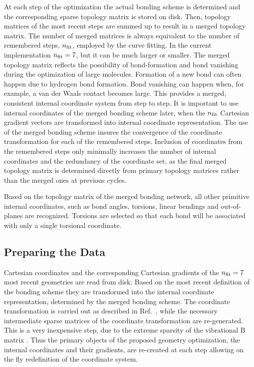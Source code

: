 \documentclass[prl,twocolumn,showpacs,twocolumngrid,superbib]{revtex4}
\begin{document}
At each step of the optimization the actual bonding scheme is determined and the corresponding 
sparse topology matrix is stored on disk.  Then, topology matrices of the most recent steps are 
summed up to result in a merged topology matrix.  The number of merged matrices is always equivalent 
to the number of remembered steps, $n_{\rm fit}$, employed by the curve fitting. In the current implementation 
$n_{\rm fit}=7$, but it can be much larger or smaller.  The merged topology matrix reflects the possibility of 
bond-formation and bond vanishing during the optimization of large molecules.  Formation of a new 
bond can often happen due to hydrogen bond formation. Bond vanishing can happen when, for example,
a van der Waals contact becomes large.  This provides a merged, consistent internal coordinate 
system from step to step.  It is important to use internal coordinates
of the merged bonding scheme later, when the $n_{\rm fit}$ Cartesian gradient
vectors are transformed into internal coordinate representation. The use of the merged bonding 
scheme insures the convergence of the coordinate transformation for each of the remembered steps.
Inclusion of coordinates from the remembered steps only minimally increases the number of internal 
coordinates and the redundancy of the coordinate set, as the final merged topology matrix is 
determined directly from primary topology matrices rather than the merged ones at previous cycles.

Based on the topology matrix of the merged bonding network, all other primitive 
internal coordinates, such as bond angles, torsions, linear bendings and 
out-of-planes are recognized. Torsions are selected so that each bond will be 
associated with only a single torsional coordinate.

\subsection{Preparing the Data}

Cartesian coordinates and the corresponding Cartesian gradients of the $n_{\rm fit}=7$ 
most recent geometries are read from disk. Based on the most recent definition of the 
bonding scheme they are transformed into the internal coordinate representation,
determined by the merged bonding scheme.
The coordinate transformation is carried out as described in Ref.~\cite{nemeth_coordtrf1}, 
while the necessary intermediate sparse matrices of 
the coordinate transformation are re-generated. 
This is a very inexpensive step, due to the extreme sparsity of the vibrational B matrix \cite{wilson}. 
Thus the primary objects of the proposed geometry optimization,  the internal coordinates and their gradients,
are re-created at each step allowing on the fly redefinition of the 
coordinate system.
\end{document}
